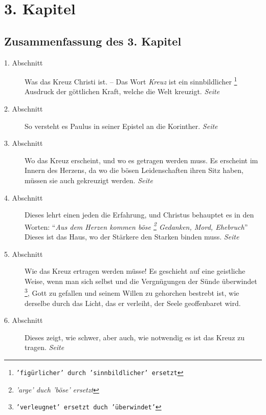 

\chapter{3. Kapitel} \label{kap3}

\section{Zusammenfassung des 3. Kapitel}


\begin{description}
\item[1. Abschnitt] Was das Kreuz Christi ist. -- Das Wort \textit{Kreuz} ist ein
sinnbildlicher
\footnote{\texttt{'figürlicher' durch 'sinnbildlicher' ersetzt}}
Ausdruck der göttlichen Kraft, welche die Welt kreuzigt.
\dotfill \textit{Seite~\pageref{kap3_ab1}}\\
\item[2. Abschnitt] So versteht es Paulus in seiner Epistel an die
Korinther.
\dotfill \textit{Seite~\pageref{kap3_ab2}}\\
\item[3. Abschnitt] Wo das Kreuz erscheint, und wo es getragen werden muss. Es
erscheint im Innern des Herzens, da wo die bösen Leidenschaften ihren Sitz haben,
müssen sie auch gekreuzigt werden.
\dotfill \textit{Seite~\pageref{kap3_ab3}}\\
\item[4. Abschnitt] Dieses lehrt einen jeden
die Erfahrung, und Christus
behauptet es in den Worten: "`\textit{Aus dem Herzen kommen böse
\footnote{\textit{'arge' duch 'böse' ersetzt}} Gedanken, Mord,
Ehebruch}"' Dieses ist das Haus, wo der Stärkere den Starken binden muss.
\dotfill \textit{Seite~\pageref{kap3_ab4}}\\
\item[5. Abschnitt] Wie das Kreuz ertragen werden müsse! Es geschieht auf eine
geistliche Weise, wenn man sich selbst und die Vergnügungen der Sünde überwindet
\footnote{\texttt{'verleugnet' ersetzt duch 'überwindet'}}, Gott zu gefallen und
seinem Willen zu gehorchen bestrebt ist, wie
derselbe durch das Licht, das er verleiht, der Seele geoffenbaret wird.
\item[6. Abschnitt] Dieses zeigt, wie schwer, aber auch, wie notwendig es ist
das Kreuz zu tragen.
\dotfill \textit{Seite~\pageref{kap3_ab5}}\\
\end{description}

\newpage

